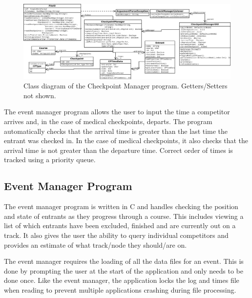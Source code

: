 \documentclass{article}
\begin{document}

\begin{figure}[H]
\centering
\includegraphics[width=1\textwidth]{diagrams/checkpoint_manager.png}
\caption{Class diagram of the Checkpoint Manager program. Getters/Setters not shown.}
\label{fig:GUI-image}
\end{figure}

The event manager program allows the user to input the time a competitor arrives and, in the case of medical checkpoints, departs. The program automatically checks that the arrival time is greater than the last time the entrant was checked in. In the case of medical checkpoints, it also checks that the arrival time is not greater than the departure time. Correct order of times is tracked using a priority queue.

\subsection{Event Manager Program}
The event manager program is written in C and handles checking the position and state of entrants as they progress through a course. This includes viewing a list of which entrants have been excluded, finished and are currently out on a track. It also gives the user the ability to query individual competitors and provides an estimate of what track/node they should/are on.

The event manager requires the loading of all the data files for an event. This is done by prompting the user at the start of the application and only needs to be done once. Like the event manager, the application locks the log and times file when reading to prevent multiple applications crashing during file processing.
\end{document}
